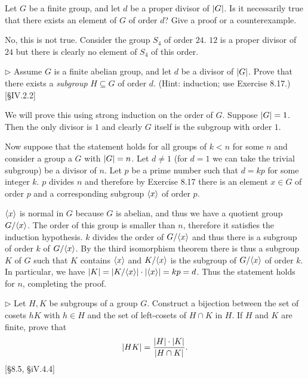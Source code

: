 \begin{problem}
	Let $G$ be a finite group, and let $d$ be a proper divisor of $\left|G\right|$. Is it necessarily true that there exists an element of $G$ of order $d$? Give a proof or a counterexample.
\end{problem}

\begin{solution}
	No, this is not true. Consider the group $S_4$ of order $24$. $12$ is a proper divisor of $24$ but there is clearly no element of $S_4$ of this order.
\end{solution}

\begin{problem}
	$\triangleright$ Assume $G$ is a finite abelian group, and let $d$ be a divisor of $\left|G\right|$. Prove that there exists a \emph{subgroup} $H \subseteq G$ of order $d$. (Hint: induction; use Exercise 8.17.) [\S IV.2.2]
\end{problem}

\begin{solution}
	We will prove this using strong induction on the order of $G$. Suppose $\left|G\right| = 1$. Then the only divisor is $1$ and clearly $G$ itself is the subgroup with order $1$.
	
	Now suppose that the statement holds for all groups of $k < n$ for some $n$ and consider a group a $G$ with $\left|G\right| = n$. Let $d \neq 1$ (for $d = 1$ we can take the trivial subgroup) be a divisor of $n$. Let $p$ be a prime number such that $d = kp$ for some integer $k$. $p$ divides $n$ and therefore by Exercise 8.17 there is an element $x \in G$ of order $p$ and a corresponding subgroup $\langle x \rangle$ of order $p$.
	
	$\langle x \rangle$ is normal in $G$ because $G$ is abelian, and thus we have a quotient group $G/\langle x \rangle$. The order of this group is smaller than $n$, therefore it satisfies the induction hypothesis. $k$ divides the order of $G/\langle x \rangle$ and thus there is a subgroup of order $k$ of $G/\langle x \rangle$. By the third isomorphism theorem there is thus a subgroup $K$ of $G$ such that $K$ contains $\langle x \rangle$ and $K/\langle x \rangle$ is the subgroup of $G/\langle x \rangle$ of order $k$. In particular, we have $\left|K\right| = \left|K/\langle x \rangle\right| \cdot \left|\langle x \rangle\right| = k p = d$. Thus the statement holds for $n$, completing the proof.
\end{solution}

\begin{problem}
	$\triangleright$ Let $H, K$ be subgroups of a group $G$. Construct a bijection between the set of cosets $hK$ with $h \in H$ and the set of left-cosets of $H \cap K$ in $H$. If $H$ and $K$ are finite, prove that
	\[
		\left|HK\right| = \frac{\left|H\right| \cdot \left|K\right|}{\left|H \cap K\right|} \text{.}
	\]
	[\S8.5, \S iV.4.4]
\end{problem}

